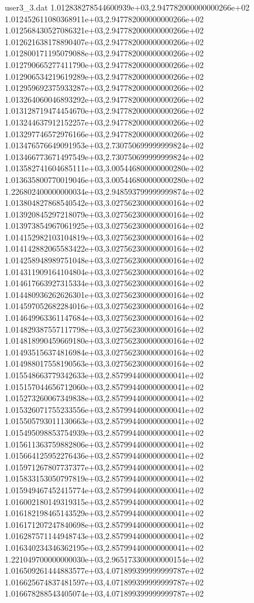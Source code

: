 \begin{filecontents}{user3_3.dat}
1.012838278544600939e+03,2.947782000000000266e+02
1.012452611080368911e+03,2.947782000000000266e+02
1.012568430527086321e+03,2.947782000000000266e+02
1.012621638178890407e+03,2.947782000000000266e+02
1.012800171195079088e+03,2.947782000000000266e+02
1.012790665277411790e+03,2.947782000000000266e+02
1.012906534219619289e+03,2.947782000000000266e+02
1.012959692375933287e+03,2.947782000000000266e+02
1.013264060046893292e+03,2.947782000000000266e+02
1.013128719474454670e+03,2.947782000000000266e+02
1.013244637912152257e+03,2.947782000000000266e+02
1.013297746572976166e+03,2.947782000000000266e+02
1.013476576649091953e+03,2.730750699999999824e+02
1.013466773671497549e+03,2.730750699999999824e+02
1.013582741604685111e+03,3.005446800000000280e+02
1.013635800770019046e+03,3.005446800000000280e+02
1.226802400000000034e+03,2.948593799999999874e+02
1.013804827868540542e+03,3.027562300000000164e+02
1.013920845297218079e+03,3.027562300000000164e+02
1.013973854967061925e+03,3.027562300000000164e+02
1.014152982103104819e+03,3.027562300000000164e+02
1.014142882065583422e+03,3.027562300000000164e+02
1.014258948989751048e+03,3.027562300000000164e+02
1.014311909164104804e+03,3.027562300000000164e+02
1.014617663927315334e+03,3.027562300000000164e+02
1.014480936262626301e+03,3.027562300000000164e+02
1.014597052682284016e+03,3.027562300000000164e+02
1.014649963361147684e+03,3.027562300000000164e+02
1.014829387557117798e+03,3.027562300000000164e+02
1.014818990459669180e+03,3.027562300000000164e+02
1.014935156374816984e+03,3.027562300000000164e+02
1.014988017558190563e+03,3.027562300000000164e+02
1.015548663779342633e+03,2.857994400000000041e+02
1.015157044656712060e+03,2.857994400000000041e+02
1.015273260067349838e+03,2.857994400000000041e+02
1.015326071755233556e+03,2.857994400000000041e+02
1.015505793011130663e+03,2.857994400000000041e+02
1.015495098853754939e+03,2.857994400000000041e+02
1.015611363759882806e+03,2.857994400000000041e+02
1.015664125952276436e+03,2.857994400000000041e+02
1.015971267807737377e+03,2.857994400000000041e+02
1.015833153050797819e+03,2.857994400000000041e+02
1.015949467452415774e+03,2.857994400000000041e+02
1.016002180149319315e+03,2.857994400000000041e+02
1.016182198465143529e+03,2.857994400000000041e+02
1.016171207247840698e+03,2.857994400000000041e+02
1.016287571144948743e+03,2.857994400000000041e+02
1.016340234346362195e+03,2.857994400000000041e+02
1.221049700000000030e+03,2.965173300000000154e+02
1.016509261444883577e+03,4.071899399999999787e+02
1.016625674837481597e+03,4.071899399999999787e+02
1.016678288543405074e+03,4.071899399999999787e+02

\end{filecontents}

